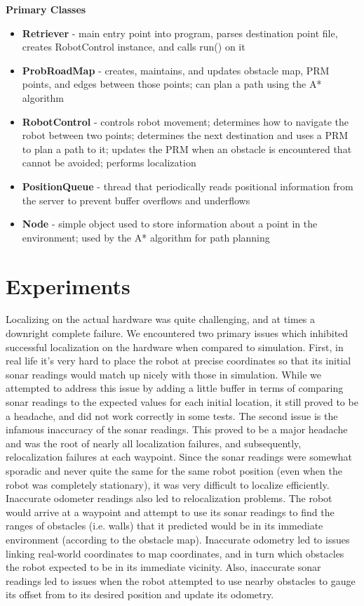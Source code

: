 \documentclass[11pt]{article}
\begin{document}
\textbf{Primary Classes}
\begin{itemize}
\item{\textbf{Retriever} - main entry point into program, parses destination point file, creates RobotControl instance, and calls run() on it}
\item{\textbf{ProbRoadMap} - creates, maintains, and updates obstacle map, PRM points, and edges between those points; 
                       can plan a path using the A* algorithm}
\item{\textbf{RobotControl} - controls robot movement; determines how to navigate the robot between two points; 
                      determines the next destination and uses a PRM to plan a path to it; updates the PRM when an obstacle is encountered 
                      that cannot be avoided; performs localization}
\item{\textbf{PositionQueue} - thread that periodically reads positional information from the server to prevent buffer overflows and underflows}
\item{\textbf{Node} - simple object used to store information about a point in the environment; used by the A* algorithm for path planning}
\end{itemize}


\section{Experiments}

Localizing on the actual hardware was quite challenging, and at times a downright complete failure. We encountered two primary issues which inhibited successful localization on the hardware when compared to simulation. First, in real life it's very hard to place the robot at precise coordinates so that its initial sonar readings would match up nicely with those in simulation. While we attempted to address this issue by adding a little buffer in terms of comparing sonar readings to the expected values for each initial location, it still proved to be a headache, and did not work correctly in some tests. The second issue is the infamous inaccuracy of the sonar readings. This proved to be a major headache and was the root of nearly all localization failures, and subsequently, relocalization failures at each waypoint. Since the sonar readings were somewhat sporadic and never quite the  same for the same robot position (even when the robot was completely stationary), it was very difficult to localize efficiently. Inaccurate odometer readings also led to relocalization problems. The robot would arrive at a waypoint and attempt to use its sonar readings to find the ranges of obstacles (i.e. walls) that it predicted would be in its immediate environment (according to the obstacle map). Inaccurate odometry led to issues linking real-world coordinates to map coordinates, and in turn which obstacles the robot expected to be in its immediate vicinity. Also, inaccurate sonar readings led to issues when the robot attempted to use nearby obstacles to gauge its offset from to its desired position and update its odometry.
\end{document}
